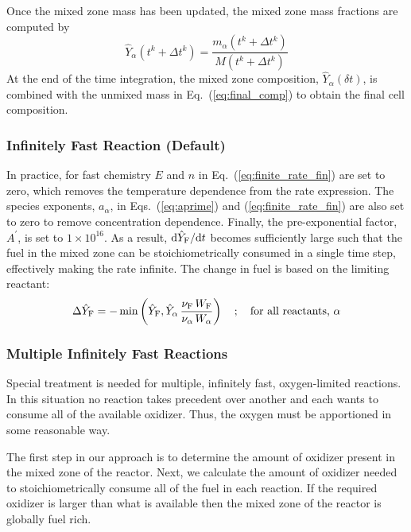 Once the mixed zone mass has been updated, the mixed zone mass fractions are computed by
\begin{equation}
\label{eq:mixed_mass_fraction_sub}
\hat{Y}_\alpha(t^k + \Delta t^k) = \frac{m_\alpha(t^k + \Delta t^k)}{M(t^k + \Delta t^k)}
\end{equation}
At the end of the time integration, the mixed zone composition, $\hat{Y}_\alpha(\delta t)$, is combined with the unmixed mass in Eq.~(\ref{eq:final_comp}) to obtain the final cell composition.

\subsubsection{Infinitely Fast Reaction (Default)}
In practice, for fast chemistry $E$ and $n$ in Eq.~(\ref{eq:finite_rate_fin}) are set to zero, which removes the temperature dependence from the rate expression. The species exponents, $a_{\alpha}$, in Eqs.~(\ref{eq:aprime}) and (\ref{eq:finite_rate_fin}) are also set to zero to remove concentration dependence. Finally, the pre-exponential factor, $A^{\prime}$, is set to $1 \times 10^{16}$. As a result, $\mbox{d}\hat{Y}_{\rm F}/\mbox{d}t$ becomes sufficiently large such that the fuel in the mixed zone can be stoichiometrically consumed in a single time step, effectively making the rate infinite. The change in fuel is based on the limiting reactant:
\begin{equation}\label{eq:stoich_fuel_single}
\Delta \hat{Y}_{\rm F} = - \min \left( \hat{Y}_{\rm F}, \hat{Y}_{\alpha} \,\frac{\nu_{\rm F}\,W_{\rm F}}{\nu_{\alpha}\,W_{\alpha}}\right) \quad ; \quad \mbox{for all reactants, $\alpha$}
\end{equation}

\subsubsection{Multiple Infinitely Fast Reactions}
Special treatment is needed for multiple, infinitely fast, oxygen-limited reactions. In this situation no reaction takes precedent over another and each wants to consume all of the available oxidizer.  Thus, the oxygen must be apportioned in some reasonable way.

The first step in our approach is to determine the amount of oxidizer present in the mixed zone of the reactor. Next, we calculate the amount of oxidizer needed to stoichiometrically consume all of the fuel in each reaction. If the required oxidizer is larger than what is available then the mixed zone of the reactor is globally fuel rich.

